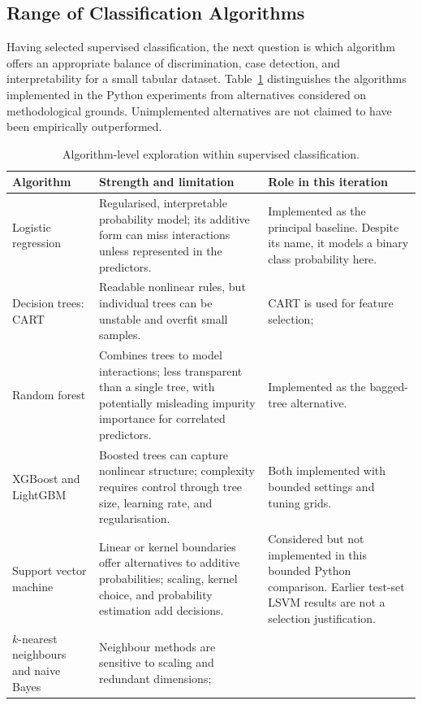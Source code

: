 \subsection{Range of Classification Algorithms}
\label{subsec:algorithm-exploration}

Having selected supervised classification, the next question is which
algorithm offers an appropriate balance of discrimination, case detection,
and interpretability for a small tabular dataset.
Table~\ref{tab:classification-algorithms} distinguishes the algorithms
implemented in the Python experiments from alternatives considered on
methodological grounds. Unimplemented alternatives are not claimed to have
been empirically outperformed.

\begin{table}[H]
\centering
\small
\caption{Algorithm-level exploration within supervised classification.}
\label{tab:classification-algorithms}
\begin{tabularx}{\textwidth}{@{}p{2.7cm}XX@{}}
\toprule
Algorithm & Strength and limitation & Role in this iteration \\
\midrule
Logistic regression &
Regularised, interpretable probability model; its additive form can miss
interactions unless represented in the predictors. &
Implemented as the principal baseline. Despite its name, it models a binary
class probability here. \\
Decision trees: CART &
Readable nonlinear rules, but individual trees can be unstable and overfit
small samples. &
CART is used for feature selection; \\
Random forest &
Combines trees to model interactions; less transparent than a single tree,
with potentially misleading impurity importance for correlated predictors. &
Implemented as the bagged-tree alternative. \\
XGBoost and LightGBM &
Boosted trees can capture nonlinear structure; complexity requires control
through tree size, learning rate, and regularisation. &
Both implemented with bounded settings and tuning grids. \\
Support vector machine &
Linear or kernel boundaries offer alternatives to additive probabilities;
scaling, kernel choice, and probability estimation add decisions. &
Considered but not implemented in this bounded Python comparison. Earlier
test-set LSVM results are not a selection justification. \\
$k$-nearest neighbours and naive Bayes &
Neighbour methods are sensitive to scaling and redundant dimensions;

\end{tabularx}
\end{table}
